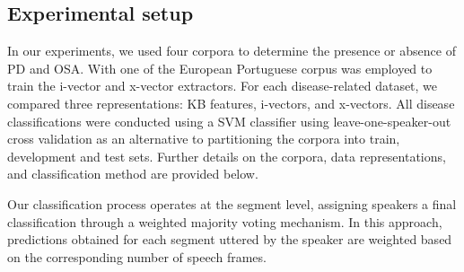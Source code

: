 \subsection{Experimental setup}
In our experiments, we used four corpora to determine the presence or absence of PD and OSA. With one of the  European Portuguese corpus was employed to train the i-vector and x-vector extractors. For each disease-related dataset, we compared three representations: KB features, i-vectors, and x-vectors. All disease classifications were conducted using a SVM classifier using leave-one-speaker-out cross validation
as an alternative to partitioning the corpora into train, development and test sets. Further details on the corpora, data representations, and classification method are provided below.

Our classification process operates at the segment level, assigning speakers a final classification through a weighted majority voting mechanism. In this approach, predictions obtained for each segment uttered by the speaker are weighted based on the corresponding number of speech frames.
